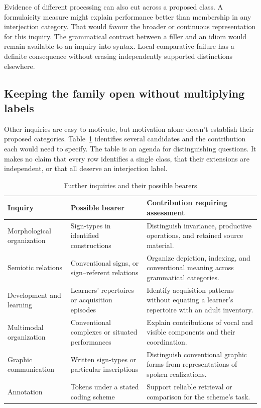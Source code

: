 \documentclass[12pt]{article}
\begin{document}
Evidence of different processing can also cut across a proposed
class. A formulaicity measure might explain performance better than
membership in any interjection category. That would favour the broader
or continuous representation for this inquiry. The grammatical contrast
between a filler and an idiom would remain available to an
inquiry into syntax. Local comparative failure has a definite consequence
without erasing independently supported distinctions elsewhere.

\subsection{Keeping the family open without multiplying labels}

Other inquiries are easy to motivate, but motivation alone doesn't
establish their proposed categories. Table~\ref{tab:extensions} identifies
several candidates and the contribution each would need to specify.
The table is an agenda for distinguishing questions. It makes no
claim that every row identifies a single class, that their extensions
are independent, or that all deserve an interjection label.

\begin{table}[htbp]
\centering
\small
\caption{Further inquiries and their possible bearers}
\label{tab:extensions}
\begin{tabular}{@{}>{\raggedright\arraybackslash}p{}
                  >{\raggedright\arraybackslash}p{}
                  >{\raggedright\arraybackslash}p{}@{}}
\toprule
Inquiry & Possible bearer & Contribution requiring assessment \\
\midrule
Morphological organization & Sign-types in identified constructions &
Distinguish invariance, productive operations, and retained source material. \\
\addlinespace
Semiotic relations & Conventional signs, or sign--referent relations &
Organize depiction, indexing, and conventional meaning across grammatical categories. \\
\addlinespace
Development and learning & Learners' repertoires or acquisition episodes &
Identify acquisition patterns without equating a learner's repertoire with an adult inventory. \\
\addlinespace
Multimodal organization & Conventional complexes or situated performances &
Explain contributions of vocal and visible components and their coordination. \\
\addlinespace
Graphic communication & Written sign-types or particular inscriptions &
Distinguish conventional graphic forms from representations of spoken realizations. \\
\addlinespace
Annotation & Tokens under a stated coding scheme &
Support reliable retrieval or comparison for the scheme's task. \\
\bottomrule
\end{tabular}
\end{table}
\end{document}
